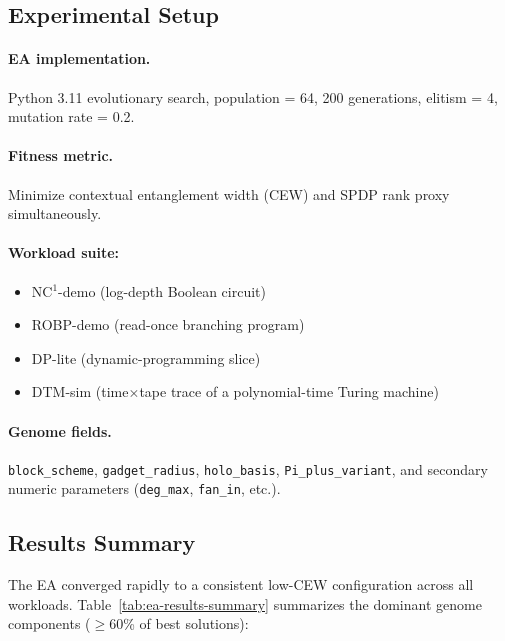 \documentclass[12pt]{article}
\theoremstyle{definition}
\theoremstyle{definition}
\theoremstyle{remark}
\theoremstyle{remark}
\begin{document}
\subsection{Experimental Setup}

\paragraph{EA implementation.}
Python 3.11 evolutionary search, population = 64, 200 generations, elitism = 4, mutation rate = 0.2.

\paragraph{Fitness metric.}
Minimize contextual entanglement width (CEW) and SPDP rank proxy simultaneously.

\paragraph{Workload suite:}
\begin{itemize}
\item NC$^1$-demo (log-depth Boolean circuit)
\item ROBP-demo (read-once branching program)
\item DP-lite (dynamic-programming slice)
\item DTM-sim (time$\times$tape trace of a polynomial-time Turing machine)
\end{itemize}

\paragraph{Genome fields.}
\texttt{block\_scheme}, \texttt{gadget\_radius}, \texttt{holo\_basis}, \texttt{Pi\_plus\_variant}, and secondary numeric parameters (\texttt{deg\_max}, \texttt{fan\_in}, etc.).

\subsection{Results Summary}

The EA converged rapidly to a consistent low-CEW configuration across all workloads. Table~\ref{tab:ea-results-summary} summarizes the dominant genome components ($\geq 60$\% of best solutions):
\end{document}
